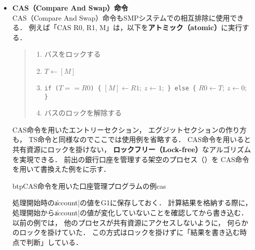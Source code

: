 \begin{itemize}
\begin{quote}
\begin{enumerate}
\item バスをロックする
\item $T \leftarrow [M]$
\item $[M] \leftarrow R$
\item $R \leftarrow T$
\item バスのロックを解除する
\end{enumerate}
\end{quote}

ここで $T$ はCPU内部の一時的なレジスタ
（$T$ レジスタの存在はプログラムから見えない）である．
にSW命令の使用例を示す．
使用例はTS命令のものと似ているので解説は省略する．

\begin{myfig}{btp}{SW命令の使用例}{swap}

\end{myfig}

\item {\bf CAS（Compare And Swap）命令}\\
CAS（Compare And Swap）命令もSMPシステムでの相互排除に使用できる．
例えば「CAS  R0, R1, M」は，以下を{\bf アトミック（atomic）}に実行する．

\begin{quote}
\begin{enumerate}
\item バスをロックする
\item $T \leftarrow [M]$
\item {\tt if ($T==R0$) \{} $[M] \leftarrow R1;~ z \leftarrow 1;$
      {\tt \} else \{} $R0 \leftarrow T;~  z \leftarrow 0;$ {\tt \}}
\item バスのロックを解除する
\end{enumerate}
\end{quote}

CAS命令を用いたエントリーセクション，
エグジットセクションの作り方も，
TS命令と同様なのでここでは使用例を省略する．
CAS命令を用いると共有資源にロックを掛けない，
{\bf ロックフリー（Lock-free）}なアルゴリズムを実現できる．
前出の銀行口座を管理する架空のプロセス（）を
CAS命令を用いて書換えた例をに示す．

\begin{myfig}{btp}{CAS命令を用いた口座管理プログラムの例}{cas}

\end{myfig}

処理開始時の\|account|の値をG1に保存しておく．
計算結果を格納する際に，
処理開始から\|account|の値が変化していないことを確認してから書き込む．
以前の例では，
他のプロセスが共有資源にアクセスしないように，
何らかのロックを掛けていた．
この方式はロックを掛けずに「結果を書き込む時点で判断」している．
\end{itemize}

